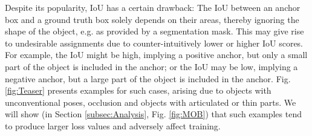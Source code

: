 \documentclass{bmvc2k}
\begin{document}
Despite its popularity, IoU has a certain drawback: The IoU between an anchor box and a ground truth box solely depends on their areas, thereby ignoring the shape of the object, e.g. as  provided by a segmentation mask. This may give rise to undesirable assignments due to counter-intuitively lower or higher IoU scores. For example, the IoU might be high, implying a positive anchor, but only a small part of the object is included in the anchor; or the IoU may be low, implying a negative anchor, but a large part of the object is included in the anchor. Fig. \ref{fig:Teaser} presents examples for such cases, arising due to objects with unconventional poses, occlusion and objects with articulated or thin parts. We will show (in Section \ref{subsec:Analysis}, Fig. \ref{fig:MOB}) that such examples tend to produce larger loss values and adversely affect training.
\end{document}
